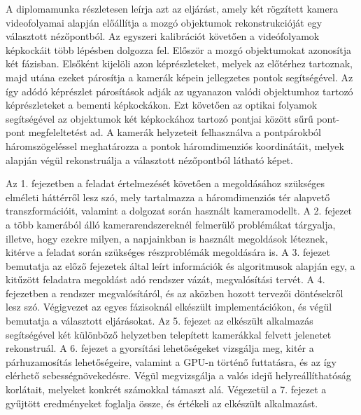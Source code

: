 A diplomamunka részletesen leírja azt az eljárást, amely két rögzített kamera videofolyamai alapján előállítja a mozgó objektumok rekonstrukcióját egy választott nézőpontból. Az egyszeri kalibrációt követően a videófolyamok képkockáit több lépésben dolgozza fel. Először a mozgó objektumokat azonosítja két fázisban. Elsőként kijelöli azon képrészleteket, melyek az előtérhez tartoznak, majd utána ezeket párosítja a kamerák képein jellegzetes pontok segítségével. Az így adódó képrészlet párosítások adják az ugyanazon valódi objektumhoz tartozó képrészleteket a bementi képkockákon. Ezt követően az optikai folyamok segítségével az objektumok két képkockához tartozó pontjai között sűrű pont-pont megfeleltetést ad. A kamerák helyzeteit felhasználva a pontpárokból háromszögeléssel meghatározza a pontok háromdimenziós koordinátáit, melyek alapján végül rekonstruálja a választott nézőpontból látható képet.

Az 1. fejezetben a feladat értelmezését követően a megoldásához szükséges elméleti háttérről lesz szó, mely tartalmazza a háromdimenziós tér alapvető transzformációit, valamint a dolgozat során használt kameramodellt. A 2. fejezet a több kamerából álló kamerarendszereknél felmerülő problémákat tárgyalja, illetve, hogy ezekre milyen, a napjainkban is használt megoldások léteznek, kitérve a feladat során szükséges részproblémák megoldására is. A 3. fejezet bemutatja az előző fejezetek által leírt információk és algoritmusok alapján egy, a kitűzött feladatra megoldást adó rendszer vázát, megvalósítási tervét. A 4. fejezetben a rendszer megvalósítáról, és az aközben hozott tervezői döntésekről lesz szó. Végigvezet az egyes fázisoknál elkészült implementációkon, és végül bemutatja a választott eljárásokat. Az 5. fejezet az elkészült alkalmazás segítségével két különböző helyzetben telepített kamerákkal felvett jelenetet rekonstruál. A 6. fejezet a gyorsítási lehetőségeket vizsgálja meg, kitér a párhuzamosítás lehetőségeire, valamint a GPU-n történő futtatásra, és az így elérhető sebességnövekedésre. Végül megvizsgálja a valós idejű helyreállíthatóság korlátait, melyeket konkrét számokkal támaszt alá. Végezetül a 7. fejezet a gyűjtött eredményeket foglalja össze, és értékeli az elkészült alkalmazást.
